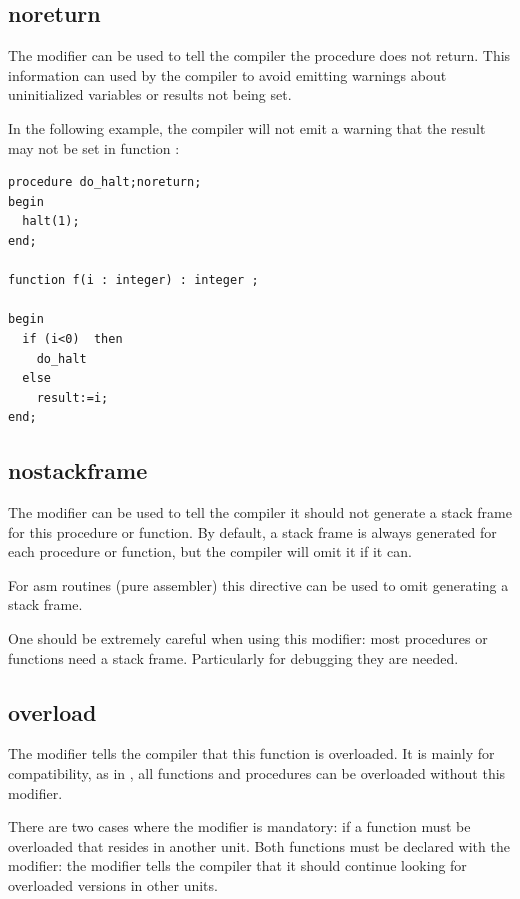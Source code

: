 \subsection{noreturn}
\label{se:noreturn}
The  modifier can be used to tell the compiler the procedure
does not return. This information can used by the compiler to avoid emitting
warnings about uninitialized variables or results not being set.

In the following example, the compiler will not emit a warning that the
result may not be set in function :
\begin{verbatim}
procedure do_halt;noreturn;
begin
  halt(1);
end;

function f(i : integer) : integer ;

begin
  if (i<0)  then
    do_halt
  else
    result:=i;
end;
\end{verbatim}

\subsection{nostackframe}
\label{se:nostackframe}
The  modifier can be used to tell the compiler it should
not generate a stack frame for this procedure or function. By default, a
stack frame is always generated for each procedure or function, but the compiler
will omit it if it can.

For asm routines (pure assembler) this directive can be used to omit generating a
stack frame.

One should be extremely careful when using this modifier: most procedures or
functions need a stack frame. Particularly for debugging they are needed.

\subsection{overload}
\label{se:overload}
The  modifier tells the compiler that this function is
overloaded. It is mainly for \delphi compatibility, as in \fpc, all
functions and procedures can be overloaded without this modifier.

There are two cases where the  modifier is mandatory:
if a function must be overloaded that resides in another unit. Both
functions must be declared with the  modifier: the
 modifier tells the compiler that it should continue
looking for overloaded versions in other units.

